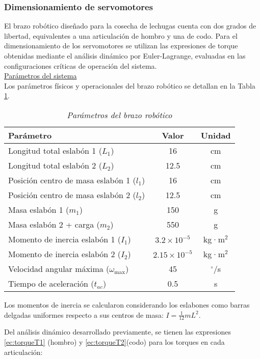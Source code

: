 \subsubsection{Dimensionamiento de servomotores}

El brazo robótico diseñado para la cosecha de lechugas cuenta con dos grados de libertad, equivalentes a una articulación de hombro y una de codo. Para el dimensionamiento de los servomotores se utilizan las expresiones de torque obtenidas mediante el análisis dinámico por Euler-Lagrange, evaluadas en las configuraciones críticas de operación del sistema.\\

\underline{Parámetros del sistema}\\

Los parámetros físicos y operacionales del brazo robótico se detallan en la Tabla \ref{tab:parametros_brazo}.

\begin{table}[htbp]
\centering
\begin{tabular}{lcc}
\hline
\textbf{Parámetro} & \textbf{Valor} & \textbf{Unidad} \\
\hline
Longitud total eslabón 1 ($L_1$) & 16 & cm \\
Longitud total eslabón 2 ($L_2$) & 12.5 & cm \\
Posición centro de masa eslabón 1 ($l_1$) & 16 & cm \\
Posición centro de masa eslabón 2 ($l_2$) & 12.5 & cm \\
Masa eslabón 1 ($m_1$) & 150 & g \\
Masa eslabón 2 + carga ($m_2$) & 550 & g \\
Momento de inercia eslabón 1 ($I_1$) & $3.2 \times 10^{-5}$ & kg·m$^2$ \\
Momento de inercia eslabón 2 ($I_2$) & $2.15 \times 10^{-5}$ & kg·m$^2$ \\
Velocidad angular máxima ($\omega_{\max}$) & 45 & $^{\circ}$/s \\
Tiempo de aceleración ($t_{ac}$) & 0.5 & s \\
\hline
\end{tabular}
\caption{\textit{Parámetros del brazo robótico}}
\label{tab:parametros_brazo}
\end{table}

Los momentos de inercia se calcularon considerando los eslabones como barras delgadas uniformes respecto a sus centros de masa: $I = \frac{1}{12}mL^2$.

Del análisis dinámico desarrollado previamente, se tienen las expresiones \ref{ec:torqueT1} (hombro) y \ref{ec:torqueT2}(codo) para los torques en cada articulación:

